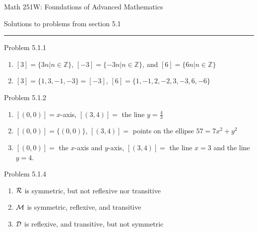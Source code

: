 \documentclass{article}
\theoremstyle{definition}
\newcommand{\Z}{\mathbb{Z}}
\begin{document}
	\begin{center}
		\Large{Math 251W: Foundations of Advanced Mathematics}

		\normalsize Solutions to problems from section 5.1 \hrule
		\vspace{0.4cm}

	\end{center}


	\noindent Problem 5.1.1  \vspace{0.3cm}

	\begin{enumerate}
		\item[2] $[3]=\{3n|n\in \Z\}$, $[-3]=\{-3n|n\in\Z\}$, and
		$[6]=\{6n|n\in\Z\}$
		\item[3] $[3]=\{1,3,-1,-3\}=[-3]$, $[6]=\{1,-1,2,-2,3,-3,6,-6\}$
	\end{enumerate}

	\vspace{1cm}


	\noindent Problem 5.1.2  \vspace{0.3cm}

	\begin{enumerate}
		\item[1] $[(0,0)]=x$-axis, $[(3,4)]=$ the line $y=\frac{4}{3}$
		\item[2] $[(0,0)]=\{(0,0)\}$, $[(3,4)]=$ points on the ellipse
		$57=7x^2+y^2$
		\item[3] $[(0,0)]=$ the $x$-axis and $y$-axis, $[(3,4)]=$ the line
		$x=3$ and the line $y=4$.
	\end{enumerate}

	\vspace{1cm}


	\noindent Problem 5.1.4  \vspace{0.3cm}

	\begin{enumerate}
		\item[2] ${\cal R}$ is symmetric, but not reflexive nor transitive
		\item[4] ${\cal M}$ is symmetric, reflexive, and transitive
		\item[6] ${\cal D}$ is reflexive, and transitive, but not symmetric

	\end{enumerate}
\end{document}

